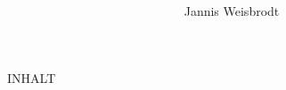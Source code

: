 \documentclass[a4paper,ngerman,10pt]{article}
\title{\textbf{\Title{}}}
\author{Jannis Weisbrodt}
\begin{document}
\maketitle
\thispagestyle{empty}

INHALT
\end{document}
